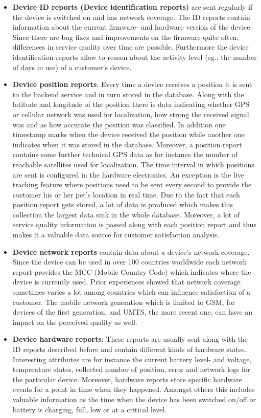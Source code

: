 \begin{itemize}
	\item \textbf{Device ID reports (Device identification reports)} are sent regularly if the device is switched on and has network coverage. The ID reports contain information about the current firmware- and hardware version of the device. Since there are bug fixes and improvements on the firmware quite often, differences in service quality over time are possible. Furthermore the device identification reports allow to reason about the activity level (eg.: the number of days in use) of a customer's device.
	\item \textbf{Device position reports}: Every time a device receives a position it is sent to the backend service and in turn stored in the database. Along with the latitude and longitude of the position there is data indicating whether GPS or cellular network was used for localization, how strong the received signal was and as how accurate the position was classified. In addition one timestamp marks when the device received the position while another one indicates when it was stored in the database. Moreover, a position report contains some further technical GPS data as for instance the number of reachable satellites used for localization. The time interval in which positions are sent is configured in the hardware electronics. An exception is the live tracking feature where positions need to be sent every second to provide the customer his or her pet's location in real time. Due to the fact that each position report gets stored, a lot of data is produced which makes this collection the largest data sink in the whole database. Moreover, a lot of service quality information is passed along with each position report and thus makes it a valuable data source for customer satisfaction analysis. 
	\item \textbf{Device network reports} contain data about a device's network coverage. Since the device can be used in over 100 countries worldwide each network report provides the MCC (Mobile Country Code) which indicates where the device is currently used. Prior experiences showed that network coverage sometimes varies a lot among countries which can influence satisfaction of a customer. The mobile network generation which is limited to GSM, for devices of the first generation, and UMTS, the more recent one, can have an impact on the perceived quality as well.
	\item \textbf{Device hardware reports}: These reports are usually sent along with the ID reports described before and contain different kinds of hardware states. Interesting attributes are for instance the current battery level- and voltage, temperature states, collected number of position, error and network logs for the particular device. Moreover, hardware reports store specific hardware events for a point in time when they happened. Amongst others this includes valuable information as the time when the device has been switched on/off or battery is charging, full, low or at a critical level. 

\end{itemize}
